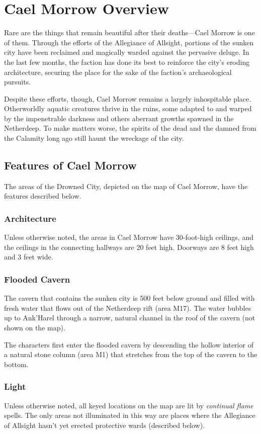 \documentclass[10pt,a4paper,twoside,bg=print,twocolumn,openany,nodeprecatedcode]{dndbook}
\begin{document}
\section{Cael Morrow Overview}
Rare are the things that remain beautiful after their deaths—Cael Morrow is one of them. Through the efforts of the Allegiance of Allsight, portions of the sunken city have been reclaimed and magically warded against the pervasive deluge. In the last few months, the faction has done its best to reinforce the city's eroding architecture, securing the place for the sake of the faction's archaeological pursuits.

Despite these efforts, though, Cael Morrow remains a largely inhospitable place. Otherworldly aquatic creatures thrive in the ruins, some adapted to and warped by the impenetrable darkness and others aberrant growths spawned in the Netherdeep. To make matters worse, the spirits of the dead and the damned from the Calamity long ago still haunt the wreckage of the city.

\subsection{Features of Cael Morrow}
The areas of the Drowned City, depicted on the map of Cael Morrow, have the features described below.

\subsubsection{Architecture}
Unless otherwise noted, the areas in Cael Morrow have 30-foot-high ceilings, and the ceilings in the connecting hallways are 20 feet high. Doorways are 8 feet high and 3 feet wide.

\subsubsection{Flooded Cavern}
The cavern that contains the sunken city is 500 feet below ground and filled with fresh water that flows out of the Netherdeep rift (area M17). The water bubbles up to Ank'Harel through a narrow, natural channel in the roof of the cavern (not shown on the map).

The characters first enter the flooded cavern by descending the hollow interior of a natural stone column (area M1) that stretches from the top of the cavern to the bottom.

\subsubsection{Light}
Unless otherwise noted, all keyed locations on the map are lit by \textit{continual flame} spells. The only areas not illuminated in this way are places where the Allegiance of Allsight hasn't yet erected protective wards (described below).
\end{document}
